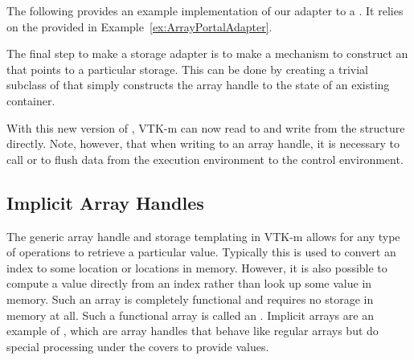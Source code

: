 The following provides an example implementation of our adapter to a
. It relies on the
 provided in
Example~\ref{ex:ArrayPortalAdapter}.


The final step to make a storage adapter is to make a mechanism to
construct an  that points to a particular
storage. This can be done by creating a trivial subclass of
 that simply constructs the array handle to the state
of an existing container.


With this new version of , VTK-m can now read
to and write from the  structure directly. Note,
however, that when writing to an array handle, it is necessary to call
 or  to flush
data from the execution environment to the control environment. 





\subsection{Implicit Array Handles}


The generic array handle and storage templating in VTK-m allows for
any type of operations to retrieve a particular value. Typically this is
used to convert an index to some location or locations in memory. However,
it is also possible to compute a value directly from an index rather than
look up some value in memory. Such an array is completely functional and
requires no storage in memory at all. Such a functional array is called an
. Implicit arrays are an example of
, which are array handles that behave like
regular arrays but do special processing under the covers to provide
values.

